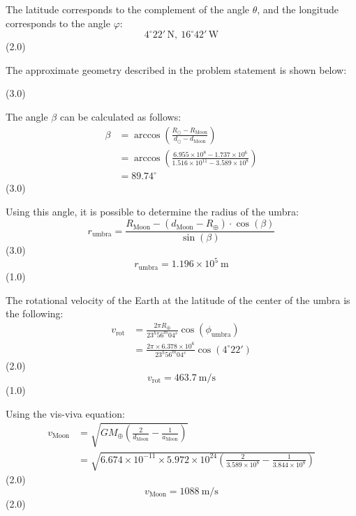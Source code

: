 \begin{description}
  The latitude corresponds to the complement of the angle $\theta$, and the
  longitude corresponds to the angle $\varphi$:
  \[
    \boxed{4^\circ 22'\,\mathrm{N},\ 16^\circ 42'\,\mathrm{W}}
  \]
  \hfill(2.0)

\item[(e)] The approximate geometry described in the problem statement is
  shown below:

  \hfill(3.0)

  The angle $\beta$ can be calculated as follows:
  \begin{align*}
    \beta &= \arccos\left(
        \frac{R_\odot - R_{\mathrm{Moon}}}{d_\odot - d_{\mathrm{Moon}}}\right)\\
      &= \arccos\left(
        \frac{6.955 \times 10^{8} - 1.737 \times 10^{6}}
             {1.516 \times 10^{11} - 3.589 \times 10^{8}}\right)\\
      &= 89.74^\circ
  \end{align*}
  \hfill(3.0)

  Using this angle, it is possible to determine the radius of the umbra:
  \[
    r_{\mathrm{umbra}} = \frac{R_{\mathrm{Moon}}
      - (d_{\mathrm{Moon}} - R_\oplus)\cdot\cos(\beta)}{\sin(\beta)}
  \]
  \hfill(3.0)
  \[
    \boxed{r_{\mathrm{umbra}} = 1.196 \times 10^{5}\ \mathrm{m}}
  \]
  \hfill(1.0)

\item[(f)] The rotational velocity of the Earth at the latitude of the center
  of the umbra is the following:
  \begin{align*}
    v_{\mathrm{rot}} &= \frac{2\pi R_\oplus}{23^h 56^m 04^s}
        \cos(\phi_{\mathrm{umbra}})\\
      &= \frac{2\pi \times 6.378 \times 10^{6}}{23^h 56^m 04^s}
        \cos(4^\circ 22')
  \end{align*}
  \hfill(2.0)
  \[
    \boxed{v_{\mathrm{rot}} = 463.7\ \mathrm{m/s}}
  \]
  \hfill(1.0)

\item[(g)] Using the vis-viva equation:
  \begin{align*}
    v_{\mathrm{Moon}} &= \sqrt{GM_\oplus\left(\frac{2}{d_{\mathrm{Moon}}}
        - \frac{1}{a_{\mathrm{Moon}}}\right)}\\
      &= \sqrt{6.674 \times 10^{-11} \times 5.972 \times 10^{24}
        \left(\frac{2}{3.589 \times 10^{8}}
            - \frac{1}{3.844 \times 10^{8}}\right)}
  \end{align*}
  \hfill(2.0)
  \[
    \boxed{v_{\mathrm{Moon}} = 1088\ \mathrm{m/s}}
  \]
  \hfill(2.0)


\end{description}
